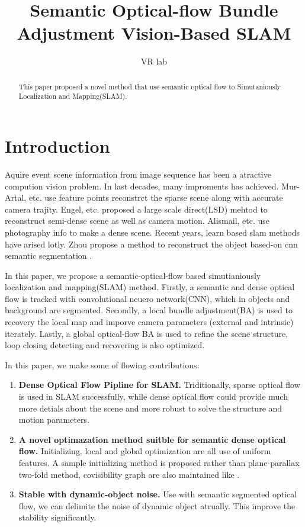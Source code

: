 \documentclass{article}
\title{Semantic Optical-flow Bundle Adjustment Vision-Based SLAM}
\author{VR lab}
\affil{State Key Laboratory of Virtual Reality Technology and Systems, BUAA University}
\begin{document}
\maketitle

\begin{abstract}

This paper proposed a novel method that use semantic optical flow to Simutaniously Localization and Mapping(SLAM).

\end{abstract}

\section{Introduction}

Aquire event scene information from image sequence has been a atractive compution vision problem. In last decades, many improments has achieved. Mur-Artal, etc. \cite{Mur2017ORB} \cite{Mur2017ORB2} use feature points reconstrct the sparse scene along with accurate camera trajity. Engel, etc. \cite{Engel2014LSD} \cite{Engel2015Large} \cite{Caruso2015Large} proposed a large scale direct(LSD) mehtod to reconstruct semi-dense scene as well as camera motion. Alismail, etc. \cite{Alismail2016Photometric} use photography info to make a dense scene. Recent years, learn based slam methods have arised lotly. Zhou propose a method to reconstruct the object based-on cnn semantic segmentation \cite{Rui2018Semantic}.\par

In this paper, we propose a semantic-optical-flow based simutianiously localization and mapping(SLAM) method. Firstly, a semantic and dense optical flow is tracked with convolutional neuero network(CNN), which in objects and background are segmented. Secondly, a local bundle adjustment(BA) is used to recovery the local map and imporve camera parameters (external and intrinsic) iterately. Lastly, a global optical-flow BA is used to refine the scene structure, loop closing detecting and recovering is also optimized. 

In this paper, we make some of flowing contributions:

\begin{enumerate}
\item \textbf{Dense Optical Flow Pipline for SLAM.} Triditionally, sparse optical flow is used in SLAM successfully, while dense optical flow could provide much more detials about the scene and more robust to solve the structure and motion parameters.

\item \textbf{A novel optimazation method suitble for semantic dense optical flow.} Initializing, local and global optimization are all use of uniform features. A sample initializing method is proposed rather than plane-parallax two-fold method, covisibility graph are also maintained like \cite{Mur2017ORB}. 

\item \textbf{Stable with dynamic-object noise.} Use with semantic segmented optical flow, we can delimite the noise of dynamic object atrually. This improve the stability significantly.
\end{enumerate}
\end{document}
